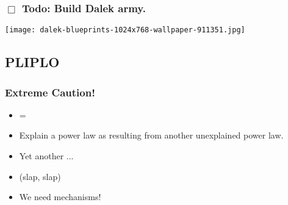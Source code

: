 
\begin{frame}[plain]
  \frametitle{$\Box$ Todo: Build Dalek army.}
  
  \texttt{[image: dalek-blueprints-1024x768-wallpaper-911351.jpg]}

\end{frame}


\subsection{PLIPLO}

\begin{frame}
  \frametitle{Extreme Caution!}

  \begin{block}{}
    \begin{itemize}
    \item<+-> 
       = 
    \item<+-> 
      Explain a power law as resulting 
      from another unexplained power law.
    \item<+->
      Yet another ...
    \item<+->
        (slap, slap)
    \item<+->
      We need mechanisms!
    \end{itemize}
  \end{block}
  
\end{frame}


